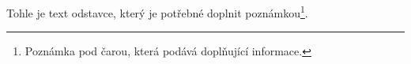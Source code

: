 Tohle je text odstavce, který je potřebné doplnit
poznámkou\footnote{Poznámka pod čarou, která
podává doplňující informace.}.